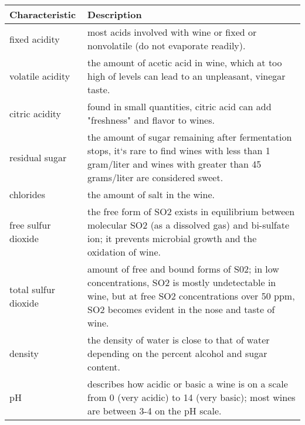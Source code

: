 \begin{tabular}{ll}
\toprule
      Characteristic &                                                                                                                                                                                      Description \\
\midrule
       fixed acidity &                                                                                                                most acids involved with wine or fixed or nonvolatile (do not evaporate readily). \\
    volatile acidity &                                                                                         the amount of acetic acid in wine, which at too high of levels can lead to an unpleasant, vinegar taste. \\
      citric acidity &                                                                                                                  found in small quantities, citric acid can add "freshness" and flavor to wines. \\
      residual sugar &                     the amount of sugar remaining after fermentation stops, it`s rare to find wines with less than 1 gram/liter and wines with greater than 45 grams/liter are considered sweet. \\
           chlorides &                                                                                                                                                                  the amount of salt in the wine. \\
 free sulfur dioxide &                                the free form of SO2 exists in equilibrium between molecular SO2 (as a dissolved gas) and bi-sulfate ion; it prevents microbial growth and the oxidation of wine. \\
total sulfur dioxide & amount of free and bound forms of S02; in low concentrations, SO2 is mostly undetectable in wine, but at free SO2 concentrations over 50 ppm, SO2 becomes evident in the nose and taste of wine. \\
             density &                                                                                               the density of water is close to that of water depending on the percent alcohol and sugar content. \\
                  pH &                                                          describes how acidic or basic a wine is on a scale from 0 (very acidic) to 14 (very basic); most wines are between 3-4 on the pH scale. \\

\end{tabular}
